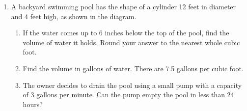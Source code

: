 \documentclass[12pt, twoside]{article}
\begin{document}
\begin{enumerate}
\newpage
\item A backyard swimming pool has the shape of a cylinder 12 feet in diameter and 4 feet high, as shown in the diagram.
  \begin{enumerate}
    \item If the water comes up to 6 inches below the top of the pool, find the volume of water it holds. Round your answer to the nearest whole cubic foot.
    \begin{flushright}
  \end{flushright} \vspace{2cm}
  \item Find the volume in gallons of water. There are 7.5 gallons per cubic foot. \vspace{4cm}
  \item The owner decides to drain the pool using a small pump with a capacity of 3 gallons per minute. Can the pump empty the pool in less than 24 hours?
\end{enumerate}

\end{enumerate}
\end{document}
